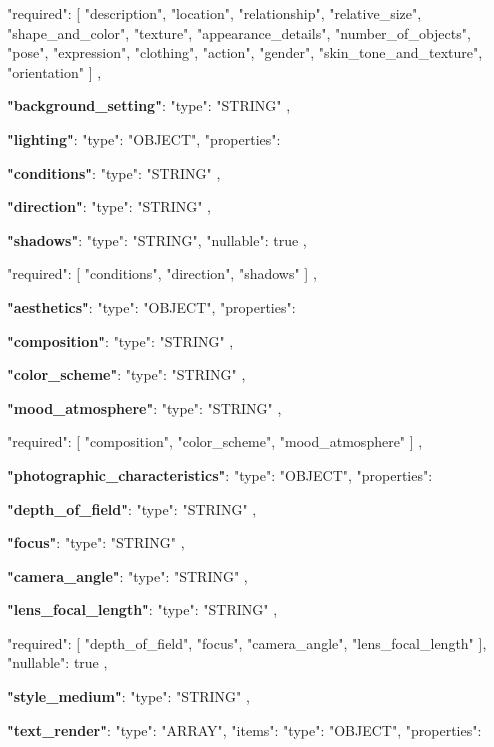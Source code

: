 \begin{table}[t]
\begin{tcolorbox}[
    colback=gray!3,
    colframe=gray!30,
    sharp corners,
    left=3pt,right=3pt,top=2pt,bottom=2pt,
    before skip=2pt, after skip=2pt,        
    fontupper=\ttfamily\scriptsize,    
]
\quad \quad "required": [
"description",
"location",
"relationship",
"relative\_size",
"shape\_and\_color",
"texture",
"appearance\_details",
"number\_of\_objects",
"pose",
"expression",
"clothing",
"action",
"gender",
"skin\_tone\_and\_texture",
"orientation"
]
,

\quad \textbf{"background\_setting"}: 
"type": "STRING"
,

\quad \textbf{"lighting"}: 
"type": "OBJECT",
"properties": 

\quad \quad \textbf{"conditions"}: 
"type": "STRING"
,

\quad \quad \textbf{"direction"}: 
"type": "STRING"
,

\quad \quad \textbf{"shadows"}: 
"type": "STRING",
"nullable": true
,

\quad \quad "required": [
"conditions",
"direction",
"shadows"
]
,

\quad \textbf{"aesthetics"}: 
"type": "OBJECT",
"properties": 

\quad \quad \textbf{"composition"}: 
"type": "STRING"
,

\quad \quad \textbf{"color\_scheme"}: 
"type": "STRING"
,

\quad \quad \textbf{"mood\_atmosphere"}: 
"type": "STRING"
,

"required": [
"composition",
"color\_scheme",
"mood\_atmosphere"
]
,

\quad \textbf{"photographic\_characteristics"}: 
"type": "OBJECT",
"properties": 

\quad\quad\textbf{"depth\_of\_field"}: 
"type": "STRING"
,

\quad\quad\textbf{"focus"}: 
"type": "STRING"
,

\quad\quad\textbf{"camera\_angle"}: 
"type": "STRING"
,

\quad\quad\textbf{"lens\_focal\_length"}: 
"type": "STRING"
,

\quad\quad"required": [
"depth\_of\_field",
"focus",
"camera\_angle",
"lens\_focal\_length"
],
"nullable": true
,

\quad \textbf{"style\_medium"}: 
"type": "STRING"
,

\quad \textbf{"text\_render"}: 
"type": "ARRAY",
"items": 
"type": "OBJECT",
"properties": 


\end{tcolorbox}
\end{table}

